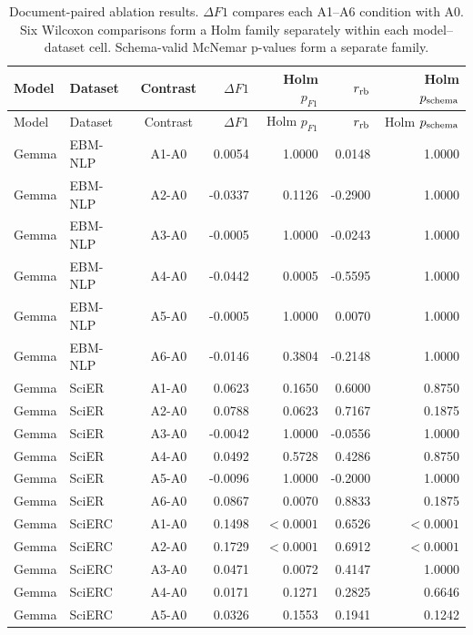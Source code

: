 \documentclass[fleqn,10pt]{wlscirep-authoryear}
\begin{document}
\begingroup
\footnotesize
\setlength{\tabcolsep}{4pt}
\setlength{\LTleft}{0pt}
\setlength{\LTright}{0pt}
\begin{longtable}{llcrrrr}
\caption{Document-paired ablation results. $\Delta F1$ compares each A1--A6 condition with A0. Six Wilcoxon comparisons form a Holm family separately within each model--dataset cell. Schema-valid McNemar p-values form a separate family.}\label{tab:r1-ablations-full}\\
\toprule
Model & Dataset & Contrast & $\Delta F1$ & Holm $p_{F1}$ & $r_{\rm rb}$ & Holm $p_{\rm schema}$ \\
\midrule
\endfirsthead
\toprule
Model & Dataset & Contrast & $\Delta F1$ & Holm $p_{F1}$ & $r_{\rm rb}$ & Holm $p_{\rm schema}$ \\
\midrule
\endhead
\bottomrule
\endfoot
Gemma & EBM-NLP & A1-A0 & 0.0054 & 1.0000 & 0.0148 & 1.0000 \\
Gemma & EBM-NLP & A2-A0 & -0.0337 & 0.1126 & -0.2900 & 1.0000 \\
Gemma & EBM-NLP & A3-A0 & -0.0005 & 1.0000 & -0.0243 & 1.0000 \\
Gemma & EBM-NLP & A4-A0 & -0.0442 & 0.0005 & -0.5595 & 1.0000 \\
Gemma & EBM-NLP & A5-A0 & -0.0005 & 1.0000 & 0.0070 & 1.0000 \\
Gemma & EBM-NLP & A6-A0 & -0.0146 & 0.3804 & -0.2148 & 1.0000 \\
\addlinespace[2pt]
Gemma & SciER & A1-A0 & 0.0623 & 0.1650 & 0.6000 & 0.8750 \\
Gemma & SciER & A2-A0 & 0.0788 & 0.0623 & 0.7167 & 0.1875 \\
Gemma & SciER & A3-A0 & -0.0042 & 1.0000 & -0.0556 & 1.0000 \\
Gemma & SciER & A4-A0 & 0.0492 & 0.5728 & 0.4286 & 0.8750 \\
Gemma & SciER & A5-A0 & -0.0096 & 1.0000 & -0.2000 & 1.0000 \\
Gemma & SciER & A6-A0 & 0.0867 & 0.0070 & 0.8833 & 0.1875 \\
\addlinespace[2pt]
Gemma & SciERC & A1-A0 & 0.1498 & $<0.0001$ & 0.6526 & $<0.0001$ \\
Gemma & SciERC & A2-A0 & 0.1729 & $<0.0001$ & 0.6912 & $<0.0001$ \\
Gemma & SciERC & A3-A0 & 0.0471 & 0.0072 & 0.4147 & 1.0000 \\
Gemma & SciERC & A4-A0 & 0.0171 & 0.1271 & 0.2825 & 0.6646 \\
Gemma & SciERC & A5-A0 & 0.0326 & 0.1553 & 0.1941 & 0.1242 \\

\end{longtable}
\end{document}
